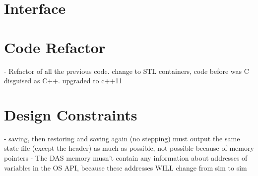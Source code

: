 {\section{\Cpp Interface}

\section{Code Refactor}
- Refactor of all the previous code. change to STL containers, code before was C disguised as C++. upgraded to c++11

\section{Design Constraints}
- saving, then restoring and saving again (no stepping) must output the same state file (except the header) as much as possible, not possible because of memory pointers
- The DAS memory musn't contain any information about addresses of variables in the OS API, because these addresses WILL change from sim to sim
}